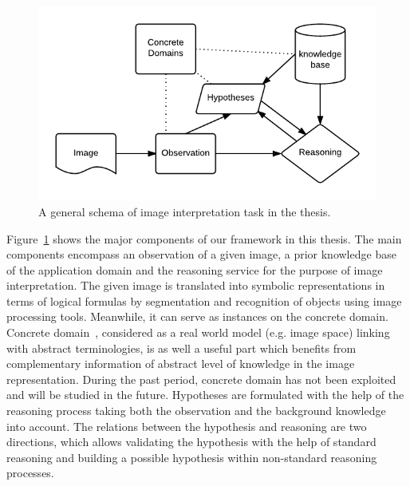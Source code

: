 \documentclass{article}
\begin{document}

\begin{figure}[h]
  \centering
   \includegraphics[scale=.8]{./figures/schemageneral.pdf}
   \caption{\label{fig:intro_schema} A general schema of image interpretation task in the thesis.}
 \end{figure} 

Figure~\ref{fig:intro_schema} shows the major components of our framework in this thesis. 
The main components encompass an observation of a given image, a prior knowledge base of the application domain and the reasoning service for the purpose of image interpretation. 
The given image is translated into symbolic representations in terms of logical formulas by segmentation and recognition of objects using image processing tools.
Meanwhile, it can serve as instances on the concrete domain.
Concrete domain~\cite{carsten2005keys}, considered as a real world model (e.g. image space) linking with abstract terminologies, 
is as well a useful part which benefits from complementary information of abstract level of knowledge in the image representation.
During the past period, concrete domain has not been exploited and will be studied in the future.
Hypotheses are formulated with the help of the reasoning process taking both the observation and the background knowledge into account.
The relations between the hypothesis and reasoning are two directions, which allows validating the hypothesis with the help of standard reasoning and
building a possible hypothesis within non-standard reasoning processes.
\end{document}
